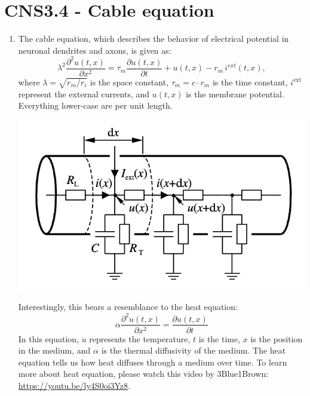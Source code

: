\documentclass[11pt,letterpaper]{article}
\begin{document}
\pagebreak


\section{CNS3.4 - Cable equation}
\begin{enumerate}
    \item 
    The cable equation, which describes the behavior of electrical potential in neuronal dendrites and axons, is given as:
    \begin{equation}
        \lambda^2 \frac{\partial^2 u(t, x)}{\partial x^2} = \tau_m \frac{\partial u(t, x)}{\partial t} + u(t, x) - r_m \, i^{ext} (t, x),
    \end{equation}
    where $\lambda = \sqrt{r_m / r_i}$ is the space constant, $\tau_m = c \cdot r_m$ is the time constant, $i^{\text{ext}}$ represent the external currents, and $u(t, x)$ is the membrane potential. Everything lower-case are per unit length.
    \begin{center}
    \includegraphics[scale=0.5]{4.1.png}
    \end{center}
    
    Interestingly, this bears a resemblance to the heat equation:
    \begin{equation}
    \alpha \frac{\partial^2 u(t, x)}{\partial x^2} = \frac{\partial u(t, x)}{\partial t}
    \end{equation}
    In this equation, $u$ represents the temperature, $t$ is the time, $x$ is the position in the medium, and $\alpha$ is the thermal diffusivity of the medium. The heat equation tells us how heat diffuses through a medium over time. To learn more about heat equation, please watch this video by 3Blue1Brown: \url{https://youtu.be/ly4S0oi3Yz8}. 
    

\end{enumerate}
\end{document}
